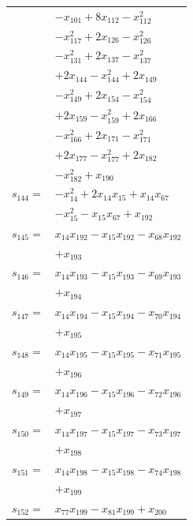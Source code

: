 \begin{longtable}{@{}r@{\;}l@{}}
 & \(\displaystyle -x_{101} +8x_{112} -x_{112}^{2}\) \\
 & \(\displaystyle -x_{117}^{2} +2x_{126} -x_{126}^{2}\) \\
 & \(\displaystyle -x_{131}^{2} +2x_{137} -x_{137}^{2}\) \\
 & \(\displaystyle +2x_{144} -x_{144}^{2} +2x_{149}\) \\
 & \(\displaystyle -x_{149}^{2} +2x_{154} -x_{154}^{2}\) \\
 & \(\displaystyle +2x_{159} -x_{159}^{2} +2x_{166}\) \\
 & \(\displaystyle -x_{166}^{2} +2x_{171} -x_{171}^{2}\) \\
 & \(\displaystyle +2x_{177} -x_{177}^{2} +2x_{182}\) \\
 & \(\displaystyle -x_{182}^{2} +x_{190}\) \\[3pt]
\(s_{144}=\) & \(\displaystyle -x_{14}^{2} +2x_{14}x_{15} +x_{14}x_{67}\) \\
 & \(\displaystyle -x_{15}^{2} -x_{15}x_{67} +x_{192}\) \\[3pt]
\(s_{145}=\) & \(\displaystyle x_{14}x_{192} -x_{15}x_{192} -x_{68}x_{192}\) \\
 & \(\displaystyle +x_{193}\) \\[3pt]
\(s_{146}=\) & \(\displaystyle x_{14}x_{193} -x_{15}x_{193} -x_{69}x_{193}\) \\
 & \(\displaystyle +x_{194}\) \\[3pt]
\(s_{147}=\) & \(\displaystyle x_{14}x_{194} -x_{15}x_{194} -x_{70}x_{194}\) \\
 & \(\displaystyle +x_{195}\) \\[3pt]
\(s_{148}=\) & \(\displaystyle x_{14}x_{195} -x_{15}x_{195} -x_{71}x_{195}\) \\
 & \(\displaystyle +x_{196}\) \\[3pt]
\(s_{149}=\) & \(\displaystyle x_{14}x_{196} -x_{15}x_{196} -x_{72}x_{196}\) \\
 & \(\displaystyle +x_{197}\) \\[3pt]
\(s_{150}=\) & \(\displaystyle x_{14}x_{197} -x_{15}x_{197} -x_{73}x_{197}\) \\
 & \(\displaystyle +x_{198}\) \\[3pt]
\(s_{151}=\) & \(\displaystyle x_{14}x_{198} -x_{15}x_{198} -x_{74}x_{198}\) \\
 & \(\displaystyle +x_{199}\) \\[3pt]
\(s_{152}=\) & \(\displaystyle x_{77}x_{199} -x_{81}x_{199} +x_{200}\) \\[3pt]

\end{longtable}
